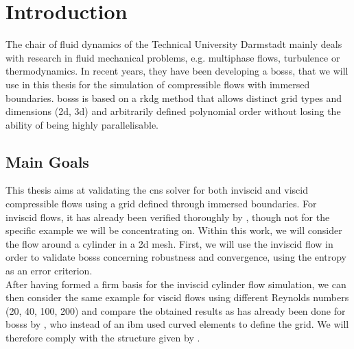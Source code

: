 \chapter{Introduction}
The chair of fluid dynamics of the Technical University Darmstadt mainly deals with research in fluid mechanical problems, e.g. multiphase flows, turbulence or thermodynamics. In recent years, they have been developing a \acrlong{bosss}, that we will use in this thesis for the simulation of compressible flows with immersed boundaries. \gls{bosss} is based on a \gls{rkdg} method that allows  distinct grid types and dimensions (\gls{2d}, \gls{3d}) and arbitrarily defined polynomial order without losing the ability of being highly parallelisable. 

\section{Main Goals}

This thesis aims at validating the \gls{cns} solver for both inviscid and viscid compressible flows using a grid defined through immersed boundaries. For inviscid flows, it has already been verified thoroughly by \textcite{mueller2014}, though not for the specific example we will be concentrating on. 
Within this work, we will consider the flow around a cylinder in a \gls{2d} mesh. First, we will use the inviscid flow in order to validate \gls{bosss} concerning robustness and convergence, using the entropy as an error criterion. \\ \indent
After having formed a firm basis for the inviscid cylinder flow simulation, we can then consider the same example for viscid flows using different Reynolds numbers (20, 40, 100, 200) and compare the obtained results as has already been done for \gls{bosss} by \textcite{ayers}, who instead of an \gls{ibm} used curved elements to define the grid. We will therefore comply with the structure given by \textcite{ayers}.


